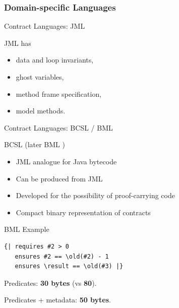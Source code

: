 \documentclass[12pt]{beamer}
\begin{document}
\subsubsection{Domain-specific Languages}
\label{sec:runver-dbc-dsl}

\begin{frame}[fragile]{Contract Languages: \small JML}

  JML \parencite{jml} has

  \begin{itemize}
    \item data and loop invariants,
    \item ghost variables,
    \item method frame specification,
    \item model methods.
  \end{itemize}
\end{frame}


\begin{frame}{Contract Languages: \small BCSL / BML}

  BCSL \parencite{bcsl} (later BML \parencite{bml})

  \begin{itemize}
    \item JML analogue for Java bytecode
    \item Can be produced from JML
    \item Developed for the possibility of proof-carrying code
    \item Compact binary representation of contracts
  \end{itemize}
\end{frame}

\begin{frame}[fragile]{BML Example}
  \begin{verbatim}
{| requires #2 > 0
   ensures #2 == \old(#2) - 1
   ensures \result == \old(#3) |}
  \end{verbatim}

  \vspace{0.25cm}

  Predicates: \textbf{30 bytes} (vs \textbf{80}).

  \vspace{0.25cm}

  Predicates + metadata: \textbf{50 bytes}.
\end{frame}
\end{document}
